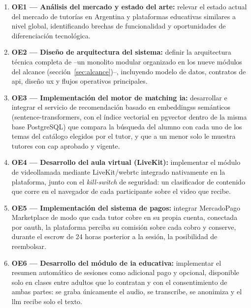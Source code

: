 \begin{enumerate}
    \item \textbf{OE1 --- Análisis del mercado y estado del arte:} relevar
          el estado actual del mercado de tutorías en Argentina y
          plataformas educativas similares a nivel global, identificando
          brechas de funcionalidad y oportunidades de diferenciación
          tecnológica.
    \item \textbf{OE2 --- Diseño de arquitectura del sistema:} definir la
          arquitectura técnica completa de \sistema{} --un monolito
          modular organizado en los nueve módulos del alcance
          (sección~\ref{sec:alcance})--, incluyendo modelo de datos,
          contratos de \gls{api}, diseño \gls{ux} y flujos operativos
          principales.
    \item \textbf{OE3 --- Implementación del motor de \gls{matching}
          \gls{ia}:} desarrollar e integrar el servicio de recomendación
          basado en \glspl{embeddings} semánticos (sentence-transformers,
          con el índice vectorial en pgvector dentro de la misma base
          PostgreSQL) que compara la búsqueda del alumno con cada uno de
          los temas del catálogo elegidos por el tutor, y que a un menor
          solo le muestra tutores con \gls{cap} aprobado y vigente.
    \item \textbf{OE4 --- Desarrollo del aula virtual (LiveKit):}
          implementar el módulo de videollamada mediante
          LiveKit/\gls{webrtc} integrado nativamente en la plataforma,
          junto con el \emph{kill-switch} de seguridad: un clasificador de
          contenido que corre en el navegador de cada participante sobre
          el video que recibe.
    \item \textbf{OE5 --- Implementación del sistema de pagos:} integrar
          MercadoPago Marketplace de modo que cada tutor cobre en su
          propia cuenta, conectada por \gls{oauth}, la plataforma perciba
          su comisión sobre cada cobro y conserve, durante el
          \gls{escrow} de 24 horas posterior a la sesión, la posibilidad
          de reembolsar.
    \item \textbf{OE6 --- Desarrollo del módulo de \gls{ia} educativa:}
          implementar el resumen automático de sesiones como adicional
          pago y opcional, disponible solo en clases entre adultos que lo
          contratan y con el consentimiento de ambas partes: se graba
          únicamente el audio, se transcribe, se anonimiza y el
          \gls{llm} recibe solo el texto.

\end{enumerate}
